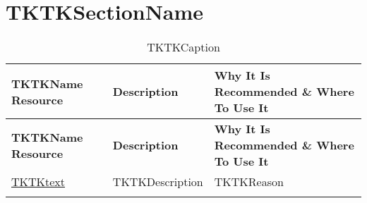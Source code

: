 
\clearpage
\section{TKTKSectionName}

\setlength\LTleft{0pt}
\setlength\LTright{0pt}
\begin{longtable}[c]{|p{}|p{}|p{}|}
  \hline
  \rowcolor{owasplightpurple}
  \textbf{TKTKName Resource} &
  \textbf{Description} &
  \textbf{Why It Is Recommended \& Where To Use It} \\
  \hline
  \endfirsthead
  \hline
  \rowcolor{owasplightpurple}
  \textbf{TKTKName Resource} &
  \textbf{Description} &
  \textbf{Why It Is Recommended \& Where To Use It} \\
  \hline
  \endhead
  \endfoot
  \href{TKTKlink}{TKTKtext} &
  TKTKDescription &
  TKTKReason \\
  \hline
  \caption{TKTKCaption}
  \label{tab:TKTKlabel}
\end{longtable}
